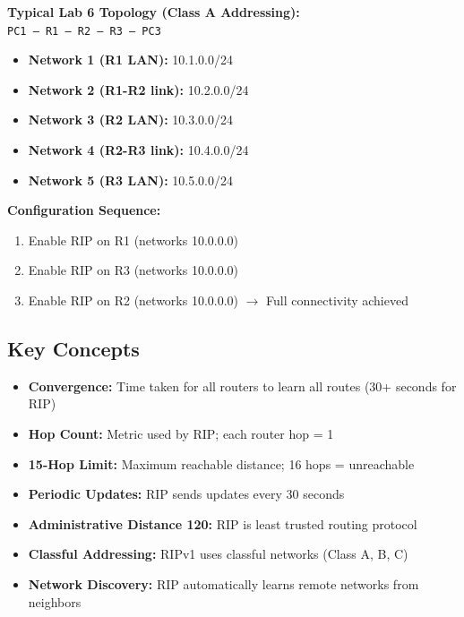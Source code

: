 \documentclass[12pt,a4paper]{article}
\begin{document}
\begin{center}
\begin{tcolorbox}[colback=light,colframe=primary,width=0.9\textwidth]
\textbf{Typical Lab 6 Topology (Class A Addressing):}\\[0.2cm]
\texttt{PC1 --- R1 --- R2 --- R3 --- PC3}\\[0.3cm]
\begin{itemize}[noitemsep]
    \item \textbf{Network 1 (R1 LAN):} 10.1.0.0/24
    \item \textbf{Network 2 (R1-R2 link):} 10.2.0.0/24
    \item \textbf{Network 3 (R2 LAN):} 10.3.0.0/24
    \item \textbf{Network 4 (R2-R3 link):} 10.4.0.0/24
    \item \textbf{Network 5 (R3 LAN):} 10.5.0.0/24
\end{itemize}

\vspace{0.2cm}
\textbf{Configuration Sequence:}
\begin{enumerate}[noitemsep]
    \item Enable RIP on R1 (networks 10.0.0.0)
    \item Enable RIP on R3 (networks 10.0.0.0)
    \item Enable RIP on R2 (networks 10.0.0.0) $\rightarrow$ Full connectivity achieved
\end{enumerate}
\end{tcolorbox}
\end{center}

\subsection{Key Concepts}

\begin{itemize}
    \item \textbf{Convergence:} Time taken for all routers to learn all routes (30+ seconds for RIP)
    \item \textbf{Hop Count:} Metric used by RIP; each router hop = 1
    \item \textbf{15-Hop Limit:} Maximum reachable distance; 16 hops = unreachable
    \item \textbf{Periodic Updates:} RIP sends updates every 30 seconds
    \item \textbf{Administrative Distance 120:} RIP is least trusted routing protocol
    \item \textbf{Classful Addressing:} RIPv1 uses classful networks (Class A, B, C)
    \item \textbf{Network Discovery:} RIP automatically learns remote networks from neighbors
\end{itemize}
\end{document}
